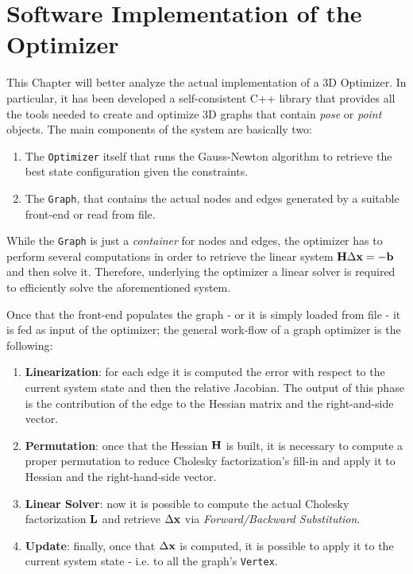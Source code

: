 \chapter{Software Implementation of the Optimizer}\label{ch:implementation}
This Chapter will better analyze the actual implementation of a 3D Optimizer. In particular, it has been developed a self-consistent C++ library that provides all the tools needed to create and optimize 3D graphs that contain \textit{pose} or \textit{point} objects. The main components of the system are basically two:

\begin{enumerate}
    \item The \texttt{Optimizer} itself that runs the Gauss-Newton algorithm to retrieve the best state configuration given the constraints.
    \item The \texttt{Graph}, that contains the actual nodes and edges generated by a suitable front-end or read from file.
\end{enumerate}

While the \texttt{Graph} is just a \textit{container} for nodes and edges, the optimizer has to perform several computations in order to retrieve the linear system $\mathbf{H} \Delta \mathbf{x} = -\mathbf{b}$ and then solve it. Therefore, underlying the optimizer a linear solver is required to efficiently solve the aforementioned system. 

Once that the front-end populates the graph - or it is simply loaded from file - it is fed as input of the optimizer; the general work-flow of a graph optimizer is the following:

\begin{enumerate}
    \item \textbf{Linearization}: for each edge it is computed the error with respect to the current system state and then the relative Jacobian. The output of this phase is the contribution of the edge to the Hessian matrix and the right-and-side vector.
    \item \textbf{Permutation}: once that the Hessian $\mathbf{H}$ is built, it is necessary to compute a proper permutation to reduce Cholesky factorization's fill-in and apply it to Hessian and the right-hand-side vector.
    \item \textbf{Linear Solver}: now it is possible to compute the actual Cholesky factorization $\mathbf{L}$ and retrieve $\Delta \mathbf{x}$ via \textit{Forward/Backward Substitution}.
    \item \textbf{Update}: finally, once that $\Delta \mathbf{x}$ is computed, it is possible to apply it to the current system state -  i.e. to all the graph's \texttt{Vertex}.
\end{enumerate}

